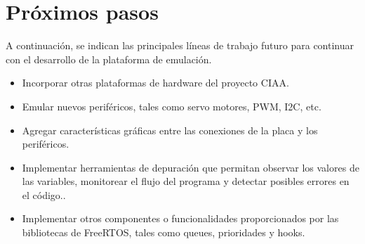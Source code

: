 \section{Próximos pasos}

A continuación, se indican las principales líneas de trabajo futuro para continuar con el desarrollo de la plataforma de emulación.

\begin{itemize}

\item Incorporar otras plataformas de hardware del proyecto CIAA.

\item Emular nuevos periféricos, tales como servo motores, PWM, I2C, etc.

\item Agregar características gráficas entre las conexiones de la placa y los periféricos.

\item Implementar herramientas de depuración que permitan observar los valores de las variables, monitorear el flujo del programa y detectar posibles errores en el código..

\item Implementar otros componentes o funcionalidades proporcionados por las bibliotecas de FreeRTOS, tales como queues, prioridades y hooks.


\end{itemize}